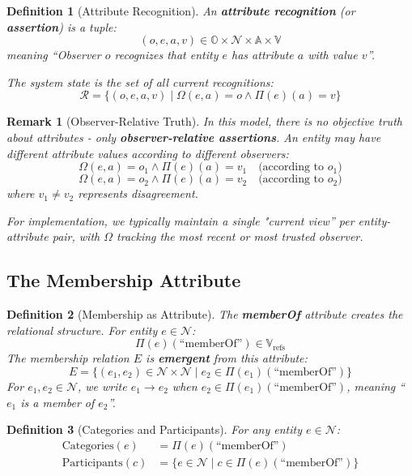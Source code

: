 \documentclass[11pt]{article}
\newtheorem{definition}{Definition}
\newtheorem{remark}{Remark}
\begin{document}
\begin{definition}[Attribute Recognition]
An \textbf{attribute recognition} (or \textbf{assertion}) is a tuple:
\[
(o, e, a, v) \in \mathbb{O} \times \mathcal{N} \times \mathbb{A} \times \mathbb{V}
\]
meaning ``Observer $o$ recognizes that entity $e$ has attribute $a$ with value $v$''.

The system state is the set of all current recognitions:
\[
\mathcal{R} = \{ (o, e, a, v) \mid \Omega(e, a) = o \land \Pi(e)(a) = v \}
\]
\end{definition}

\begin{remark}[Observer-Relative Truth]
In this model, there is no objective truth about attributes  -  only \textbf{observer-relative assertions}. An entity may have different attribute values according to different observers:
\[
\Omega(e, a) = o_1 \land \Pi(e)(a) = v_1 \quad \text{(according to } o_1\text{)}
\]
\[
\Omega(e, a) = o_2 \land \Pi(e)(a) = v_2 \quad \text{(according to } o_2\text{)}
\]
where $v_1 \neq v_2$ represents disagreement.

For implementation, we typically maintain a single "current view'' per entity-attribute pair, with $\Omega$ tracking the most recent or most trusted observer.
\end{remark}

\subsection{The Membership Attribute}

\begin{definition}[Membership as Attribute]
The \textbf{memberOf} attribute creates the relational structure. For entity $e \in \mathcal{N}$:
\[
\Pi(e)(\text{``memberOf''}) \in \mathbb{V}_{\text{refs}}
\]
The membership relation $E$ is \textbf{emergent} from this attribute:
\[
E = \{ (e_1, e_2) \in \mathcal{N} \times \mathcal{N} \mid e_2 \in \Pi(e_1)(\text{``memberOf''}) \}
\]
For $e_1, e_2 \in \mathcal{N}$, we write $e_1 \to e_2$ when $e_2 \in \Pi(e_1)(\text{``memberOf''})$, meaning ``$e_1$ is a member of $e_2$''.
\end{definition}

\begin{definition}[Categories and Participants]
For any entity $e \in \mathcal{N}$:
\begin{align}
\text{Categories}(e) &= \Pi(e)(\text{``memberOf''}) \\
\text{Participants}(c) &= \{ e \in \mathcal{N} \mid c \in \Pi(e)(\text{``memberOf''}) \}
\end{align}
\end{definition}
\end{document}
